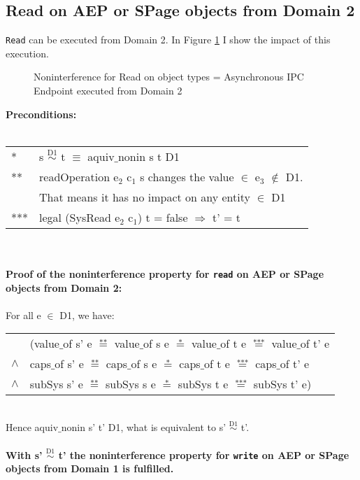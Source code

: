 \subsection{Read on AEP or SPage objects from Domain 2}
\texttt{Read} can be executed from Domain 2. In Figure \ref{fig:ReadOut2} I show the impact of this execution. 
\begin{figure}[H]
\caption{Noninterference for Read on object types = Asynchronous IPC Endpoint executed from Domain 2}
\label{fig:ReadOut2}
\end{figure}
\textbf{Preconditions:} \\ \\
\begin{tabular}{ll}
* & s $\overset{\text{D1}}{\sim}$ t $\equiv$ aquiv$\_$nonin s t D1	\\ 
** & readOperation e$_2$ c$_1$ s changes the value $\in$ e$_3$ $\notin$ D1. \\
& That means it has no impact on any entity $\in$ D1 \\ 
*** & legal (SysRead e$_2$ c$_1$) t = false $\Rightarrow$ t' = t
\end{tabular} \\ \\ 
\textbf{Proof of the noninterference property for \texttt{read} on AEP or SPage objects from Domain 2:}\\ \\
For all e $\in$ D1, we have: \\ 
\begin{tabular}{ll}
& (value$\_$of s' e $\overset{\text{**}}{=}$ value$\_$of s e $\overset{\text{*}}{=}$ value$\_$of t e $\overset{\text{***}}{=}$ value$\_$of t' e \\
$\wedge$ & caps$\_$of s' e $\overset{\text{**}}{=}$ caps$\_$of s e $\overset{\text{*}}{=}$ caps$\_$of t e $\overset{\text{***}}{=}$ caps$\_$of t' e \\
$\wedge$ & subSys s' e $\overset{\text{**}}{=}$ subSys s e $\overset{\text{*}}{=}$ subSys t e $\overset{\text{***}}{=}$ subSys t' e)
\end{tabular} \\
Hence aquiv$\_$nonin s' t' D1, what is equivalent to s' $\overset{\text{D1}}{\sim}$ t'. \\ \\ 
\textbf{With s' $\overset{\text{D1}}{\sim}$ t' the noninterference property for \texttt{write} on AEP or SPage objects from Domain 1 is fulfilled.}  
